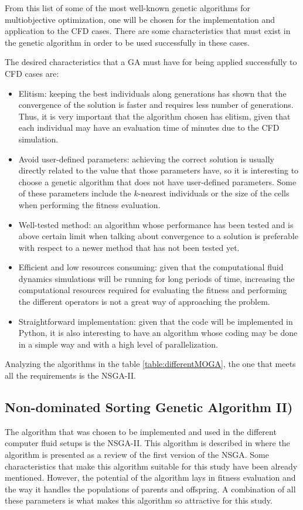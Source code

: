 From this list of some of the most well-known genetic algorithms for multiobjective optimization, one will be chosen for the implementation and application to the CFD cases. There are some characteristics that must exist in the genetic algorithm in order to be used successfully in these cases.

\newpage

The desired characteristics that a GA  must have for being applied successfully to CFD cases are:
\begin{itemize}
    \item Elitism: keeping the best individuals along generations has shown that the convergence of the solution is faster and requires less number of generations. Thus, it is very important that the algorithm chosen has elitism, given that each individual may have an evaluation time of minutes due to the CFD simulation. 
    \item Avoid user-defined parameters: achieving the correct solution is usually directly related to the value that those parameters have, so it is interesting to choose a genetic algorithm that does not have user-defined parameters. Some of these parameters include the $k$-nearest individuals or the size of the cells when performing the fitness evaluation. 
    \item Well-tested method: an algorithm whose performance has been tested and is above certain limit when talking about convergence to a solution is preferable with respect to a newer method that has not been tested yet. 
    \item Efficient and low resources consuming: given that the computational fluid dynamics simulations will be running for long periods of time, increasing the computational resources required for evaluating the fitness and performing the different operators is not a great way of approaching the problem.
    \item Straightforward implementation: given that the code will be implemented in Python, it is also interesting to have an algorithm whose coding may be done in a simple way and with a high level of parallelization.
\end{itemize}
Analyzing the algorithms in the table \ref{table:differentMOGA}, the one that meets all the requirements is the NSGA-II. 

\subsection{Non-dominated Sorting Genetic Algorithm II)}
The algorithm that was chosen to be implemented and used in the different computer fluid setups is the NSGA-II. This algorithm is described in \cite{deb2002fast} where the algorithm is presented as a review of the first version of the NSGA. Some characteristics that make this algorithm suitable for this study have been already mentioned. However, the potential of the algorithm lays in fitness evaluation and the way it handles the populations of parents and offspring. A combination of all these parameters is what makes this algorithm so attractive for this study. 

